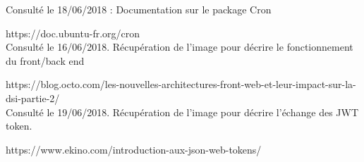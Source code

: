 \documentclass[12pt, twoside, openright]{report}
\begin{document}
Consulté le 18/06/2018 : Documentation sur le package Cron 

https://doc.ubuntu-fr.org/cron \\

Consulté le 16/06/2018. Récupération de l'image pour décrire le fonctionnement du front/back end

https://blog.octo.com/les-nouvelles-architectures-front-web-et-leur-impact-sur-la-dsi-partie-2/ \\

Consulté le 19/06/2018. Récupération de l'image pour décrire l'échange des JWT token.

https://www.ekino.com/introduction-aux-json-web-tokens/%


\printbibliography[heading=bibintoc]

\tableofcontents
\end{document}
